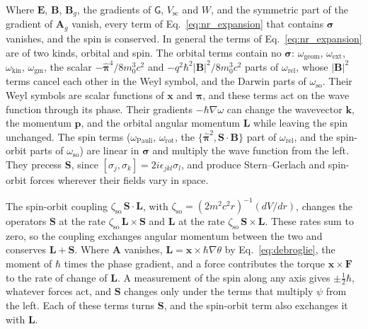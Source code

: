 \documentclass[aps,prd,onecolumn,tightenlines,nofootinbib,notitlepage,11pt,floatfix]{revtex4-2}
\theoremstyle{indentedtheorem}
\begin{document}
Where $\mathbf{E}$, $\mathbf{B}$, $\mathbf{B}_g$, the gradients of $\mathsf{G}$, $V_\text{sc}$ and $W$, and the symmetric part of the gradient of $\mathbf{A}_g$ vanish, every term of Eq.~\eqref{eq:nr_expansion} that contains $\boldsymbol{\sigma}$ vanishes, and the spin is conserved. In general the terms of Eq.~\eqref{eq:nr_expansion} are of two kinds, orbital and spin. The orbital terms contain no $\boldsymbol{\sigma}$: $\omega_\text{geom}$, $\omega_\text{ext}$, $\omega_\text{kin}$, $\omega_\text{gm}$, the scalar $-\hat{\boldsymbol{\pi}}^4/8m_0^3c^2$ and $-q^2\hbar^2|\mathbf{B}|^2/8m_0^3c^2$ parts of $\omega_\text{rel}$, whose $|\mathbf{B}|^2$ terms cancel each other in the Weyl symbol, and the Darwin parts of $\omega_\text{so}$. Their Weyl symbols are scalar functions of $\mathbf{x}$ and $\boldsymbol{\pi}$, and these terms act on the wave function through its phase. Their gradients $-\hbar\nabla\omega$ can change the wavevector $\mathbf{k}$, the momentum $\mathbf{p}$, and the orbital angular momentum $\mathbf{L}$ while leaving the spin unchanged. The spin terms ($\omega_\text{Pauli}$, $\omega_\text{rot}$, the $\{\hat{\boldsymbol{\pi}}^2,\mathbf{S}\cdot\mathbf{B}\}$ part of $\omega_\text{rel}$, and the spin-orbit parts of $\omega_\text{so}$) are linear in $\boldsymbol{\sigma}$ and multiply the wave function from the left. They precess $\mathbf{S}$, since $[\sigma_j,\sigma_k]=2i\epsilon_{jkl}\sigma_l$, and produce Stern--Gerlach and spin-orbit forces wherever their fields vary in space.

The spin-orbit coupling $\zeta_\text{so}\,\mathbf{S}\cdot\mathbf{L}$, with $\zeta_\text{so}=(2m^2c^2r)^{-1}(dV/dr)$, changes the operators $\mathbf{S}$ at the rate $\zeta_\text{so}\,\mathbf{L}\times\mathbf{S}$ and $\mathbf{L}$ at the rate $\zeta_\text{so}\,\mathbf{S}\times\mathbf{L}$. These rates sum to zero, so the coupling exchanges angular momentum between the two and conserves $\mathbf{L}+\mathbf{S}$. Where $\mathbf{A}$ vanishes, $\mathbf{L}=\mathbf{x}\times\hbar\nabla\theta$ by Eq.~\eqref{eq:debroglie}, the moment of $\hbar$ times the phase gradient, and a force contributes the torque $\mathbf{x}\times\mathbf{F}$ to the rate of change of $\mathbf{L}$. A measurement of the spin along any axis gives $\pm\tfrac{1}{2}\hbar$, whatever forces act, and $\mathbf{S}$ changes only under the terms that multiply $\psi$ from the left. Each of these terms turns $\mathbf{S}$, and the spin-orbit term also exchanges it with $\mathbf{L}$.
\end{document}
